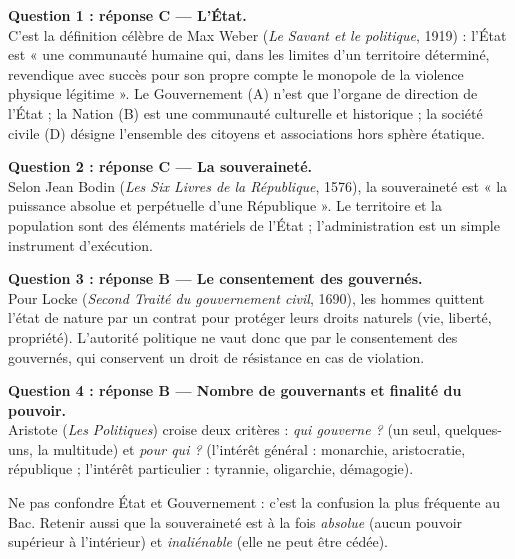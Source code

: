 \documentclass[11pt]{article}
\newcommand{\cle}[1]{{\popxbold\color{popdark}#1}}
\begin{document}
\begin{corrige}
\textbf{Question 1 : réponse C — L'État.}\\
C'est la définition célèbre de Max Weber (\emph{Le Savant et le politique}, 1919) : l'État est « une communauté humaine qui, dans les limites d'un territoire déterminé, revendique avec succès pour son propre compte le monopole de la violence physique légitime ». Le Gouvernement (A) n'est que l'organe de direction de l'État ; la Nation (B) est une communauté culturelle et historique ; la société civile (D) désigne l'ensemble des citoyens et associations hors sphère étatique.

\textbf{Question 2 : réponse C — La souveraineté.}\\
Selon Jean Bodin (\emph{Les Six Livres de la République}, 1576), la souveraineté est « la puissance absolue et perpétuelle d'une République ». Le territoire et la population sont des éléments matériels de l'État ; l'administration est un simple instrument d'exécution.

\textbf{Question 3 : réponse B — Le consentement des gouvernés.}\\
Pour Locke (\emph{Second Traité du gouvernement civil}, 1690), les hommes quittent l'état de nature par un contrat pour protéger leurs droits naturels (vie, liberté, propriété). L'autorité politique ne vaut donc que par le consentement des gouvernés, qui conservent un droit de résistance en cas de violation.

\textbf{Question 4 : réponse B — Nombre de gouvernants et finalité du pouvoir.}\\
Aristote (\emph{Les Politiques}) croise deux critères : \emph{qui gouverne ?} (un seul, quelques-uns, la multitude) et \emph{pour qui ?} (l'intérêt général : monarchie, aristocratie, république ; l'intérêt particulier : tyrannie, oligarchie, démagogie).
\end{corrige}

\begin{attention}
Ne pas confondre \cle{État} et \cle{Gouvernement} : c'est la confusion la plus fréquente au Bac. Retenir aussi que la souveraineté est à la fois \emph{absolue} (aucun pouvoir supérieur à l'intérieur) et \emph{inaliénable} (elle ne peut être cédée).
\end{attention}
\end{document}
